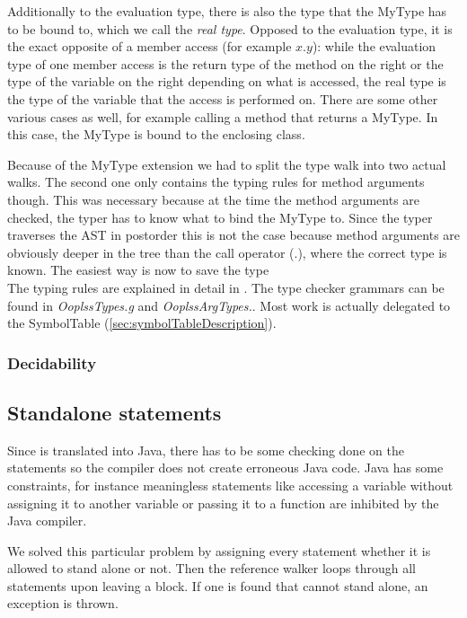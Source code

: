 Additionally to the evaluation type, there is also the type that the
MyType has to be bound to, which we call the \emph{real type}. Opposed
to the evaluation type, it is the exact opposite of a member access
(for example $x.y$): while the evaluation type of one member access
is the return type of the method on the right or the type of the variable 
on the right depending on what is accessed, the real type is the type
of the variable that the access is performed on. There are some other
various cases as well, for example calling a method that returns
a MyType. In this case, the MyType is bound to the enclosing class.


Because of the MyType extension we had to split the type walk into two
actual walks. The second one only contains the typing rules for method
arguments though. This was necessary because at the time the method
arguments are checked, the typer has to know what to bind the MyType
to. Since the typer traverses the AST in postorder this is not the case
because method arguments are obviously deeper in the tree than the
call operator (.), where the correct type is known. The easiest way
is now to save the type \\

The typing rules are explained in detail in . The
type checker grammars can be found in \emph{OoplssTypes.g} and 
\emph{OoplssArgTypes.}. Most work is actually delegated to 
the SymbolTable (\ref{sec:symbolTableDescription}).

\subsubsection{Decidability}

\subsection{Standalone statements}

Since \ooplss is translated into Java, there has to be some checking
done on the statements so the compiler does not create erroneous Java
code. Java has some constraints, for instance meaningless statements
like accessing a variable without assigning it to another variable
or passing it to a function are inhibited by the Java compiler.

We solved this particular problem by assigning every statement whether
it is allowed to stand alone or not. Then the reference walker loops
through all statements upon leaving a block. If one is found that cannot
stand alone, an exception is thrown.

